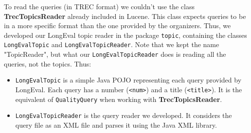 To read the queries (in TREC format) we couldn't use the class \textbf{TrecTopicsReader} already included in Lucene.
This class expects queries to be in a more specific format than the one provided by the organizers.
Thus, we developed our LongEval topic reader in the package \texttt{topic}, containing the classes
\texttt{LongEvalTopic} and \texttt{LongEvalTopicReader}.
Note that we kept the name "TopicReader", but what our \texttt{LongEvalTopicReader} does is reading all the queries,
not the topics.
Thus:
\begin{itemize}
    \item \texttt{LongEvalTopic} is a simple Java POJO representing each query provided by LongEval.
          Each query has a number (\texttt{<num>}) and a title (\texttt{<title>}).
          It is the equivalent of \texttt{QualityQuery} when working with \textbf{TrecTopicsReader}.
    \item \texttt{LongEvalTopicReader} is the query reader we developed.
          It considers the query file as an XML file and parses it using the Java XML library.
\end{itemize}